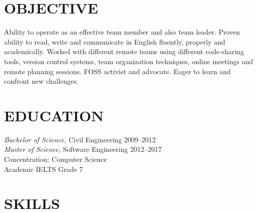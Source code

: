 \documentclass[margin, 10pt]{res} %
\begin{document}
\begin{resume}


\section{OBJECTIVE}
Ability to operate as an effective team member and also team leader.
Proven ability to read, write and communicate in English fluently, properly and academically.
Worked with different remote teams  using different code-sharing tools,
version control systems, team organization techniques, online meetings and remote
planning sessions.
FOSS activist and advocate. Eager to learn and confront new challenges.

\section{EDUCATION}

{\sl Bachelor of Science,} Civil Engineering 2009--2012 \\
{\sl Master of Science,} Software Engineering 2012--2017 \\
Concentration: Computer Science \\
Academic IELTS Grade 7

\section{SKILLS}


\end{resume}
\end{document}

